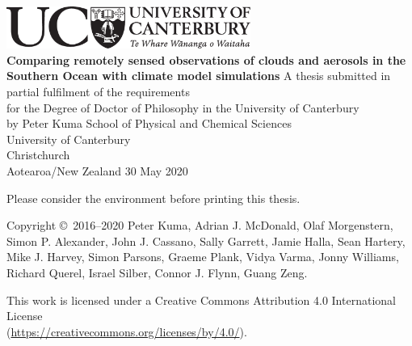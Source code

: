 \thispagestyle{empty}
\begin{center}
\centering
\includegraphics[width=0.6\textwidth]{fig/UCBlack_LAN_Te_Reo.pdf}\\
\vfill
\huge
\sffamily
\textbf{Comparing remotely sensed observations of clouds and
aerosols in the Southern Ocean with climate model
simulations}
\normalfont
\vfill
\Large
A thesis submitted in partial fulfilment of the requirements\\
for the Degree of Doctor of Philosophy
in the University of Canterbury\\
by Peter Kuma
\vfill
School of Physical and Chemical Sciences\\
University of Canterbury\\
Christchurch\\
Aotearoa/New Zealand
\vfill
30 May 2020
\end{center}
\clearpage
\thispagestyle{empty}
\normalfont
\null
\vfill
\noindent
\begin{center}
\large
\noindent
Please consider the environment before printing this thesis.
\end{center}
\vfill
\noindent
Copyright \copyright\ 2016--2020 Peter Kuma,
Adrian J. McDonald, Olaf Morgenstern, Simon P. Alexander, John J. Cassano,
Sally Garrett, Jamie Halla, Sean Hartery, Mike J. Harvey, Simon Parsons,
Graeme Plank, Vidya Varma, Jonny Williams, Richard Querel, Israel Silber, Connor J. Flynn,
Guang Zeng.\\
\par
\noindent
This work is licensed under a Creative Commons Attribution 4.0 International
License\\ (\href{https://creativecommons.org/licenses/by/4.0/}{https://creativecommons.org/licenses/by/4.0/}).
\clearpage

